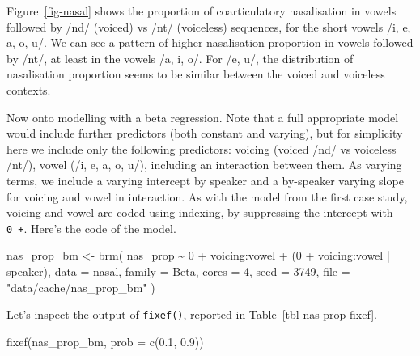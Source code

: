 \documentclass[
  authoryear,
  preprint,
  3p]{elsarticle}
\newenvironment{Shaded}{\begin{snugshade}}{\end{snugshade}}
\newcommand{\AttributeTok}[1]{\textcolor[rgb]{0.40,0.45,0.13}{#1}}
\newcommand{\DecValTok}[1]{\textcolor[rgb]{0.68,0.00,0.00}{#1}}
\newcommand{\FloatTok}[1]{\textcolor[rgb]{0.68,0.00,0.00}{#1}}
\newcommand{\FunctionTok}[1]{\textcolor[rgb]{0.28,0.35,0.67}{#1}}
\newcommand{\NormalTok}[1]{\textcolor[rgb]{0.00,0.23,0.31}{#1}}
\newcommand{\OtherTok}[1]{\textcolor[rgb]{0.00,0.23,0.31}{#1}}
\newcommand{\SpecialCharTok}[1]{\textcolor[rgb]{0.37,0.37,0.37}{#1}}
\newcommand{\StringTok}[1]{\textcolor[rgb]{0.13,0.47,0.30}{#1}}
\begin{document}
Figure~\ref{fig-nasal} shows the proportion of coarticulatory
nasalisation in vowels followed by /nd/ (voiced) vs /nt/ (voiceless)
sequences, for the short vowels /i, e, a, o, u/. We can see a pattern of
higher nasalisation proportion in vowels followed by /nt/, at least in
the vowels /a, i, o/. For /e, u/, the distribution of nasalisation
proportion seems to be similar between the voiced and voiceless
contexts.

Now onto modelling with a beta regression. Note that a full appropriate
model would include further predictors (both constant and varying), but
for simplicity here we include only the following predictors: voicing
(voiced /nd/ vs voiceless /nt/), vowel (/i, e, a, o, u/), including an
interaction between them. As varying terms, we include a varying
intercept by speaker and a by-speaker varying slope for voicing and
vowel in interaction. As with the model from the first case study,
voicing and vowel are coded using indexing, by suppressing the intercept
with \texttt{0\ +}. Here's the code of the model.

\begin{Shaded}
\begin{Highlighting}[]
\NormalTok{nas\_prop\_bm }\OtherTok{\textless{}{-}} \FunctionTok{brm}\NormalTok{(}
\NormalTok{  nas\_prop }\SpecialCharTok{\textasciitilde{}} \DecValTok{0} \SpecialCharTok{+}\NormalTok{ voicing}\SpecialCharTok{:}\NormalTok{vowel }\SpecialCharTok{+}\NormalTok{ (}\DecValTok{0} \SpecialCharTok{+}\NormalTok{ voicing}\SpecialCharTok{:}\NormalTok{vowel }\SpecialCharTok{|}\NormalTok{ speaker),}
  \AttributeTok{data =}\NormalTok{ nasal,}
  \AttributeTok{family =}\NormalTok{ Beta,}
  \AttributeTok{cores =} \DecValTok{4}\NormalTok{,}
  \AttributeTok{seed =} \DecValTok{3749}\NormalTok{,}
  \AttributeTok{file =} \StringTok{"data/cache/nas\_prop\_bm"}
\NormalTok{)}
\end{Highlighting}
\end{Shaded}

Let's inspect the output of \texttt{fixef()}, reported in
Table~\ref{tbl-nas-prop-fixef}.

\begin{Shaded}
\begin{Highlighting}[]
\FunctionTok{fixef}\NormalTok{(nas\_prop\_bm, }\AttributeTok{prob =} \FunctionTok{c}\NormalTok{(}\FloatTok{0.1}\NormalTok{, }\FloatTok{0.9}\NormalTok{))}
\end{Highlighting}
\end{Shaded}
\end{document}
